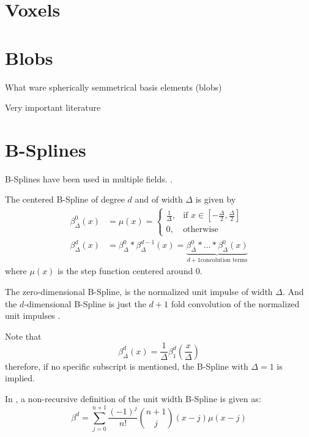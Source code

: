 
\section{Voxels}

\section{Blobs}

What ware spherically semmetrical basis elements (blobs)

Very important literature
\cite{lewitt_alternatives_1992}
\cite{matej_practical_1996}
 
\section{B-Splines}

B-Splines have been used in multiple fields. .

\begin{definition}
    \label{def:bspline}
    The centered B-Spline of degree $d$ and of width $\Delta$ is given by
    \begin{align*}
        \beta_\Delta^0(x) &= \mu(x) = 
            \begin{cases}
                \frac{1}{\Delta}, & \text{if } x \in [-\frac{\Delta}{2}, \frac{\Delta}{2}]\\
                0,           & \text{otherwise}
            \end{cases} \\
           \beta_\Delta^d(x) &= \beta_\Delta^0 * \beta_\Delta^{d-1}(x) = 
               \underbrace{\beta_\Delta^0 * \dots * \beta_\Delta^0(x)}_{d+1 \text{concolution terms}}
    \end{align*}
    where $\mu(x)$ is the step function centered around 0. 

    The zero-dimensional B-Spline, is the normalized unit impulse of width $\Delta$. And the 
    $d$-dimensional B-Spline is just the $d+1$ fold convolution of the normalized unit impulses
    \cite{horbelt_discretization_2002}.

    Note that
    \[ \beta_\Delta^d(x) = \frac{1}{\Delta} \beta_1^d(\frac{x}{\Delta}) \]
    therefore, if no specific subscript is mentioned, the B-Spline with $\Delta = 1$ is implied.

    In \cite{unser_fast_1991}, a non-recursive definition of the unit width B-Spline is given as:
    \[ \beta^d = \sum_{j=0}^{n+1} \frac{(-1)^j}{n!} \binom{n+1}{j}(x - j)\mu(x - j) \] 
\end{definition}

